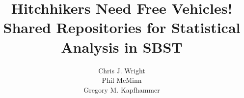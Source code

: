 \documentclass{sig-alternate}
\begin{document}


\title{Hitchhikers Need Free Vehicles! \\ Shared Repositories for Statistical Analysis in SBST\vspace*{-.05in}}


\author{
\alignauthor
Chris J. Wright\\
\alignauthor
Phil McMinn\\
\alignauthor
Gregory M. Kapfhammer\\
}

\maketitle






\vspace*{-.5em}

\scriptsize


\end{document}
